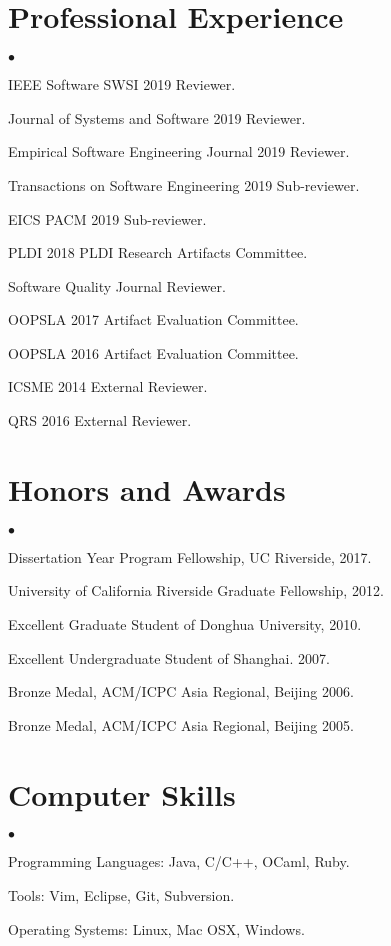 \documentclass[margin,line]{res}
\newenvironment{list2}{
  \begin{list}{$\bullet$}{%
      \setlength{\itemsep}{0in}
      \setlength{\parsep}{0in} \setlength{\parskip}{0in}
      \setlength{\topsep}{0in} \setlength{\partopsep}{0in} 
      \setlength{\leftmargin}{0.2in}}}{\end{list}}
\begin{document}
\begin{resume}
\section{\sc Professional Experience}
\begin{list2}
\item IEEE Software SWSI 2019 Reviewer.
\item Journal of Systems and Software 2019 Reviewer.
\item Empirical Software Engineering Journal 2019 Reviewer.
\item Transactions on Software Engineering 2019 Sub-reviewer.
\item EICS PACM 2019 Sub-reviewer.
\item PLDI 2018 PLDI Research Artifacts Committee.
\item Software Quality Journal Reviewer.
\item OOPSLA 2017 Artifact Evaluation Committee.
\item OOPSLA 2016 Artifact Evaluation Committee.
\item ICSME 2014 External Reviewer.
\item QRS 2016 External Reviewer.
\end{list2}

\section{\sc Honors and Awards} 
\begin{list2}
\item Dissertation Year Program Fellowship, UC Riverside, 2017.
\item University of California Riverside Graduate Fellowship, 2012.
\item Excellent Graduate Student of Donghua University, 2010.
\item Excellent Undergraduate Student of Shanghai. 2007.
\item Bronze Medal, ACM/ICPC Asia Regional, Beijing 2006.
\item Bronze Medal, ACM/ICPC Asia Regional, Beijing 2005.
\end{list2}


\section{\sc Computer Skills} 
\begin{list2}
\item Programming Languages: Java, C/C++, OCaml, Ruby.
\item Tools: Vim, Eclipse, Git, Subversion.
\item Operating Systems: Linux, Mac OSX, Windows.
\end{list2}



\end{resume}
\end{document}
